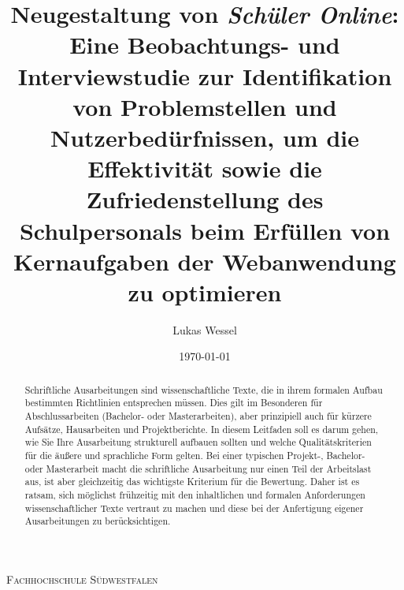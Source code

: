 \documentclass[pdftex,a4paper,abstracton,11pt,parskip=half,bibtotocnumbered]{scrartcl}
\title{Neugestaltung von \textit{Schüler Online}: Eine Beobachtungs- und Interviewstudie zur Identifikation von Problemstellen und Nutzerbedürfnissen, um die Effektivität sowie die Zufriedenstellung des Schulpersonals beim Erfüllen von Kernaufgaben der Webanwendung zu optimieren}
\author{Lukas Wessel}
\date{\today}
\begin{document}
\makeatletter
\begin{titlepage}
	\centering
	{\scshape\LARGE Fachhochschule Südwestfalen \par}
	\vspace{1cm}
	\vspace{1.5cm}
	{\huge\bfseries \@title\par}
	\vspace{3cm}
	{\Large \@author\par}
	\vspace{1cm}
	{\Large \@date\par}
	\vfill

	\raggedright
\end{titlepage}
\makeatother

\thispagestyle{empty}
\begin{abstract}
Schriftliche Ausarbeitungen sind  wissenschaftliche Texte, die in ihrem formalen Aufbau bestimmten Richtlinien entsprechen müssen.
Dies gilt im Besonderen für Abschlussarbeiten (Bachelor- oder Masterarbeiten), aber prinzipiell auch für kürzere Aufsätze, Hausarbeiten und Projektberichte.
In diesem Leitfaden soll es darum gehen, wie Sie Ihre Ausarbeitung strukturell aufbauen sollten und welche Qualitätskriterien für die äußere und sprachliche Form gelten.
Bei einer typischen Projekt-, Bachelor- oder Masterarbeit macht die schriftliche Ausarbeitung nur einen Teil der Arbeitslast aus, ist aber gleichzeitig das wichtigste Kriterium für die Bewertung.
Daher ist es ratsam, sich möglichst frühzeitig mit den inhaltlichen und formalen Anforderungen wissenschaftlicher Texte vertraut zu machen und diese bei der Anfertigung eigener Ausarbeitungen zu berücksichtigen.
\end{abstract}

\vfill
\tableofcontents
\pagebreak

\setcounter{page}{1}







%

\printbibliography
\end{document}

